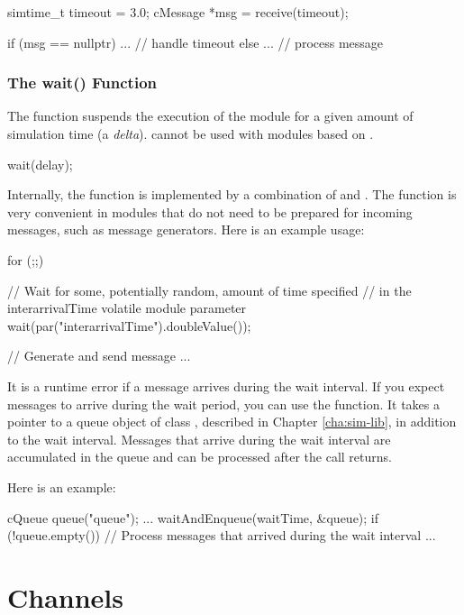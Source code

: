 \begin{cpp}
simtime_t timeout = 3.0;
cMessage *msg = receive(timeout);

if (msg == nullptr) {
    ...   // handle timeout
}
else {
    ...  // process message
}
\end{cpp}

\subsubsection{The wait() Function}
\label{sec:simple-modules:wait}

The  function suspends the execution of the module for a given
amount of simulation time (a \textit{delta}).  cannot be used with
modules based on .

\begin{cpp}
wait(delay);
\end{cpp}

Internally, the  function is implemented by a combination of
 and . The  function is very
convenient in modules that do not need to be prepared for incoming messages,
such as message generators.
Here is an example usage:

\begin{cpp}
for (;;) {
    // Wait for some, potentially random, amount of time specified
    // in the interarrivalTime volatile module parameter
    wait(par("interarrivalTime").doubleValue());

    // Generate and send message
    ...
}
\end{cpp}

It is a runtime error if a message arrives during the wait interval.
If you expect messages to arrive during the wait period, you can
use the  function. It takes a pointer to a queue object
of class , described in Chapter \ref{cha:sim-lib}, in addition
to the wait interval. Messages that arrive during the wait interval are
accumulated in the queue and can be processed after the 
call returns.

Here is an example:

\begin{cpp}
cQueue queue("queue");
...
waitAndEnqueue(waitTime, &queue);
if (!queue.empty())
{
    // Process messages that arrived during the wait interval
    ...
}
\end{cpp}


\section{Channels}
\label{sec:simple-modules:channels}

